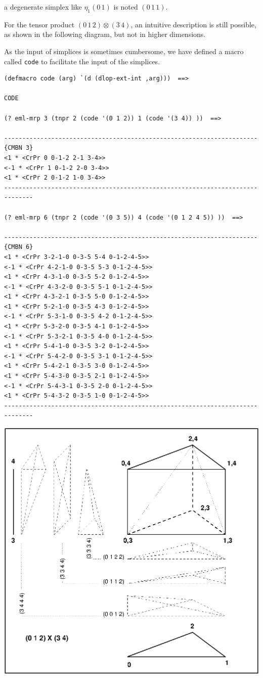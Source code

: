 a degenerate simplex like $\eta_1(0\, 1)$ is noted $(0\, 1\, 1)$.
\par
For the tensor product $(0\,1\,2)\otimes (3\,4)$, an intuitive description
is still possible, as shown in the following diagram, but not in higher dimensions.
\par
As the input of simplices is sometimes cumbersome, we have defined a macro called {\tt code}
to facilitate the input of the simplices.
{\footnotesize\begin{verbatim} 
(defmacro code (arg) `(d (dlop-ext-int ,arg)))  ==>

CODE

(? eml-mrp 3 (tnpr 2 (code '(0 1 2)) 1 (code '(3 4)) ))  ==>

----------------------------------------------------------------------{CMBN 3}
<1 * <CrPr 0 0-1-2 2-1 3-4>>
<-1 * <CrPr 1 0-1-2 2-0 3-4>>
<1 * <CrPr 2 0-1-2 1-0 3-4>>
------------------------------------------------------------------------------

(? eml-mrp 6 (tnpr 2 (code '(0 3 5)) 4 (code '(0 1 2 4 5)) ))  ==>

----------------------------------------------------------------------{CMBN 6}
<1 * <CrPr 3-2-1-0 0-3-5 5-4 0-1-2-4-5>>
<-1 * <CrPr 4-2-1-0 0-3-5 5-3 0-1-2-4-5>>
<1 * <CrPr 4-3-1-0 0-3-5 5-2 0-1-2-4-5>>
<-1 * <CrPr 4-3-2-0 0-3-5 5-1 0-1-2-4-5>>
<1 * <CrPr 4-3-2-1 0-3-5 5-0 0-1-2-4-5>>
<1 * <CrPr 5-2-1-0 0-3-5 4-3 0-1-2-4-5>>
<-1 * <CrPr 5-3-1-0 0-3-5 4-2 0-1-2-4-5>>
<1 * <CrPr 5-3-2-0 0-3-5 4-1 0-1-2-4-5>>
<-1 * <CrPr 5-3-2-1 0-3-5 4-0 0-1-2-4-5>>
<1 * <CrPr 5-4-1-0 0-3-5 3-2 0-1-2-4-5>>
<-1 * <CrPr 5-4-2-0 0-3-5 3-1 0-1-2-4-5>>
<1 * <CrPr 5-4-2-1 0-3-5 3-0 0-1-2-4-5>>
<1 * <CrPr 5-4-3-0 0-3-5 2-1 0-1-2-4-5>>
<-1 * <CrPr 5-4-3-1 0-3-5 2-0 0-1-2-4-5>>
<1 * <CrPr 5-4-3-2 0-3-5 1-0 0-1-2-4-5>>
------------------------------------------------------------------------------
\end{verbatim}}
\newpage
%
\vskip 0.40cm
\centerline{\includegraphics{eml2.eps}}
\vskip 0.40cm
%


